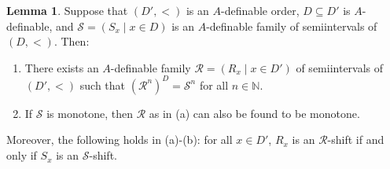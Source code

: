 \documentclass{amsart}
\theoremstyle{definition}
\newtheorem{Lemma}[Theorem]{Lemma}
\theoremstyle{definition}
\begin{document}
\begin{Lemma}\label{Lemma extending family of semiintervals}
Suppose that $(D',<)$ is an $A$-definable order, $D\subseteq D'$ is $A$-definable, 
and $\mathcal S=(S_x\mid x\in D)$ is an $A$-definable family of semiintervals of $(D,<)$. Then:
\begin{enumerate}[\hspace{10pt}(a)]
\item  There exists an $A$-definable family $\mathcal R=(R_x\mid x\in D')$ of
semiintervals of $(D',<)$ such that $(\mathcal R^n)^D=\mathcal S^n$ for all $n\in\mathbb N$.
\item If $\mathcal S$ is monotone, then $\mathcal R$ as in (a) can also be found to be monotone. 
\end{enumerate} 
Moreover, the following holds in (a)-(b): for all $x\in D'$, $R_x$ is an $\mathcal R$-shift if and only if $S_x$ is an $\mathcal S$-shift.
\end{Lemma}
\end{document}
